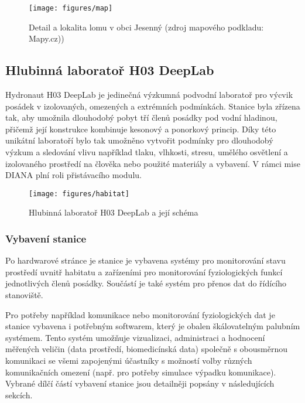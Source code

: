 \begin{figure}[h]
    \begin{center}
        \texttt{[image: figures/map]}
        \caption{Detail a lokalita lomu v obci Jesenný (zdroj mapového podkladu: Mapy.cz))}
        \label{fig:map}
    \end{center}
\end{figure}

\subsection{Hlubinná laboratoř H03 DeepLab}
\label{subsubsec:h03_deeplab}
Hydronaut H03 DeepLab je jedinečná výzkumná podvodní laboratoř pro výcvik
posádek v izolovaných, omezených a extrémních podmínkách. Stanice byla zřízena
tak, aby umožnila dlouhodobý pobyt tří členů posádky pod vodní hladinou, přičemž
její konstrukce kombinuje kesonový a ponorkový princip. Díky této unikátní
laboratoří bylo tak umožněno vytvořit podmínky pro dlouhodobý výzkum a sledování
vlivu například tlaku, vlhkosti, stresu, umělého osvětlení a izolovaného
prostředí na člověka nebo použité materiály a vybavení. V rámci mise DIANA plní
roli přistávacího modulu.

\begin{figure}[h]
    \begin{center}
        \texttt{[image: figures/habitat]}
        \caption{Hlubinná laboratoř H03 DeepLab a její schéma}
        \label{fig:habitat}
    \end{center}
\end{figure}

\subsubsection{Vybavení stanice}
\label{subsubsec:vybaveni_stanice}
Po hardwarové stránce je stanice je vybavena systémy pro monitorování stavu
prostředí uvnitř habitatu a zařízeními pro monitorování fyziologických funkcí
jednotlivých členů posádky. Součástí je také systém pro přenos dat do řídícího
stanoviště. 

Pro potřeby například komunikace nebo monitorování fyziologických dat je stanice
vybavena i potřebným softwarem, který je obalen škálovatelným palubním systémem.
Tento systém umožňuje vizualizaci, administraci a hodnocení měřených veličin
(data prostředí, biomedicínská data) společně s obousměrnou komunikaci se všemi
zapojenými účastníky s možností volby různých komunikačních omezení (např. pro
potřeby simulace výpadku komunikace). Vybrané dílčí částí vybavení stanice jsou
detailněji popsány v následujících sekcích.

